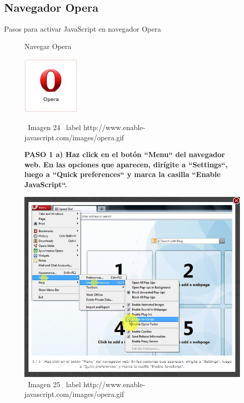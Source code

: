 \documentclass[11pt]{article} %
\begin{document}
\newpage
\subsection{Navegador Opera}
Pasos para activar JavaScript en navegador Opera
\begin{figure}
\begin{center}
\begin{center}
Navegar Opera

\end{center}
\begin{center}
\includegraphics[height=3 cm, width=3 cm] {imagenes/opera.jpg}
\end{center}

\ Imagen 24
\ label {http://www.enable-javascript.com/images/opera.gif}
\newline

\begin{center}
\bf PASO 1
a) Haz click en el botón ``Menu`` del navegador web. En las opciones que aparecen, dirígite a ``Settings``, luego a ``Quick preferences`` y marca la casilla ``Enable JavaScript``.
\end{center}
\includegraphics[height=8 cm, width=8 cm] {imagenes/opera 01.jpg}
\newline
\newline
\ Imagen 25
\ label {http://www.enable-javascript.com/images/opera.gif}

\end{center}
\end{figure}
\end{document}
